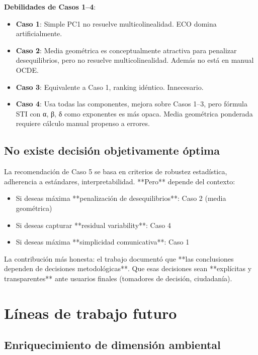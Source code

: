 \textbf{Debilidades de Casos 1--4}:

\begin{itemize}
    \item \textbf{Caso 1}: Simple PC1 no resuelve multicolinealidad. ECO domina artificialmente.
    \item \textbf{Caso 2}: Media geométrica es conceptualmente atractiva para penalizar desequilibrios, pero no resuelve multicolinealidad. Además no está en manual OCDE.
    \item \textbf{Caso 3}: Equivalente a Caso 1, ranking idéntico. Innecesario.
    \item \textbf{Caso 4}: Usa todas las componentes, mejora sobre Casos 1--3, pero fórmula STI con α, β, δ como exponentes es más opaca. Media geométrica ponderada requiere cálculo manual propenso a errores.
\end{itemize}

\subsection{No existe decisión objetivamente óptima}

La recomendación de Caso 5 se basa en criterios de robustez estadística, adherencia a estándares, interpretabilidad. **Pero** depende del contexto:

\begin{itemize}
    \item Si deseas máxima **penalización de desequilibrios**: Caso 2 (media geométrica)
    \item Si deseas capturar **residual variability**: Caso 4
    \item Si deseas máxima **simplicidad comunicativa**: Caso 1
\end{itemize}

La contribución más honesta: el trabajo documentó que **las conclusiones dependen de decisiones metodológicas**. Que esas decisiones sean **explícitas y transparentes** ante usuarios finales (tomadores de decisión, ciudadanía).

\section{Líneas de trabajo futuro}

\subsection{Enriquecimiento de dimensión ambiental}

